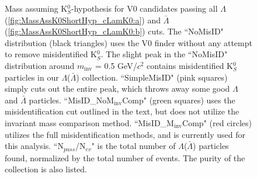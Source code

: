 \documentclass[../AnalysisNoteJBuxton.tex]{subfiles}
\begin{document}
\begin{figure}[h!]
  \centering
  \caption[K$^{0}_{S}$ contamination in $\Lambda$($\bar{\Lambda}$) collection]{Mass assuming K$^{0}_{S}$-hypothesis for V0 candidates passing all $\Lambda$ (\ref{fig:MassAssK0ShortHyp_cLamK0:a}) and $\bar{\Lambda}$ (\ref{fig:MassAssK0ShortHyp_cLamK0:b}) cuts.
  The ``NoMisID" distribution (black triangles) uses the V0 finder without any attempt to remove misidentified K$^{0}_{S}$.
  The slight peak in the ``NoMisID" distribution around $m_{\mathrm{inv}}$ = 0.5 GeV/$c^{2}$ contains misidentified K$^{0}_{S}$ particles in our $\Lambda$($\bar{\Lambda}$) collection.  
  ``SimpleMisID" (pink squares) simply cuts out the entire peak, which throws away some good $\Lambda$ and $\bar{\Lambda}$ particles.
  ``MisID\_NoM$_{\mathrm{inv}}$Comp" (green squares) uses the misidentification cut outlined in the text, but does not utilize the invariant mass comparison method.
  ``MisID\_M$_{\mathrm{inv}}$Comp" (red circles) utilizes the full misidentification methods, and is currently used for this analysis.  
  ``N$_{pass}$/N$_{ev}$" is the total number of $\Lambda$($\bar{\Lambda}$) particles found, normalized by the total number of events.  The purity of the collection is also listed.}
  \label{fig:MassAssK0ShortHyp_cLamK0}
\end{figure}
\end{document}
